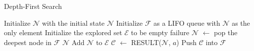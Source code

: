 \documentclass[a4paper,UKenglish,cleveref, autoref, thm-restate]{qlinhta}
\begin{document}
    \begin{algorithm}[H]
        \caption{Depth-First Search}\label{alg:dfs}
        \begin{algorithmic}[1]
                \State Initialize $\mathcal{N}$ with the initial state
                    \State \Return $\mathcal{N}$
                \EndIf
                \State Initialize $\mathcal{F}$ as a LIFO queue with $\mathcal{N}$ as the only element
                \State Initialize the explored set $\mathcal{E}$ to be empty
                        \State \Return failure
                    \EndIf
                    \State $\mathcal{N}$ $\gets$ pop the deepest node in $\mathcal{F}$
                        \State \Return $\mathcal{N}$
                    \EndIf
                    \State Add $\mathcal{N}$ to $\mathcal{E}$
                        \State $\mathcal{C}$ $\gets$ RESULT($\mathcal{N}$, $a$)
                            \State Push $\mathcal{C}$ into $\mathcal{F}$
                        \EndIf
                    \EndFor
                \EndWhile
            \EndFunction
        \end{algorithmic}
    \end{algorithm}
\end{document}
